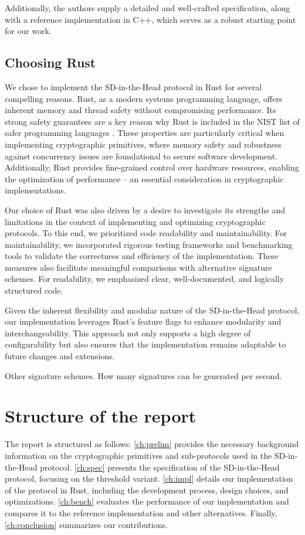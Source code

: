 \documentclass[twoside,11pt,openright]{report}
\theoremstyle{definition}
\theoremstyle{plain}
\begin{document}
Additionally, the authors supply a detailed and well-crafted specification, along with a reference implementation in C++, which serves as a robust starting point for our work.


\subsection{Choosing Rust}
We chose to implement the SD-in-the-Head protocol in Rust for several compelling reasons. Rust, as a modern systems programming language, offers inherent memory and thread safety without compromising performance. Its strong safety guarantees are a key reason why Rust is included in the NIST list of safer programming languages \cite{nistsaferlanguages}. These properties are particularly critical when implementing cryptographic primitives, where memory safety and robustness against concurrency issues are foundational to secure software development. Additionally, Rust provides fine-grained control over hardware resources, enabling the optimization of performance -- an essential consideration in cryptographic implementations.

Our choice of Rust was also driven by a desire to investigate its strengths and limitations in the context of implementing and optimizing cryptographic protocols. To this end, we prioritized code readability and maintainability. For maintainability, we incorporated rigorous testing frameworks and benchmarking tools to validate the correctness and efficiency of the implementation. These measures also facilitate meaningful comparisons with alternative signature schemes. For readability, we emphasized clear, well-documented, and logically structured code.

Given the inherent flexibility and modular nature of the SD-in-the-Head protocol, our implementation leverages Rust's feature flags to enhance modularity and interchangeability. This approach not only supports a high degree of configurability but also ensures that the implementation remains adaptable to future changes and extensions.

Other signature schemes. How many signatures can be generated per second.

\section{Structure of the report}
The report is structured as follows: \autoref{ch:prelim} provides the necessary background information on the cryptographic primitives and sub-protocols used in the SD-in-the-Head protocol. \autoref{ch:spec} presents the specification of the SD-in-the-Head protocol, focusing on the threshold variant. \autoref{ch:impl} details our implementation of the protocol in Rust, including the development process, design choices, and optimizations. \autoref{ch:bench} evaluates the performance of our implementation and compares it to the reference implementation and other alternatives. Finally, \autoref{ch:conclusion} summarizes our contributions.
\end{document}

